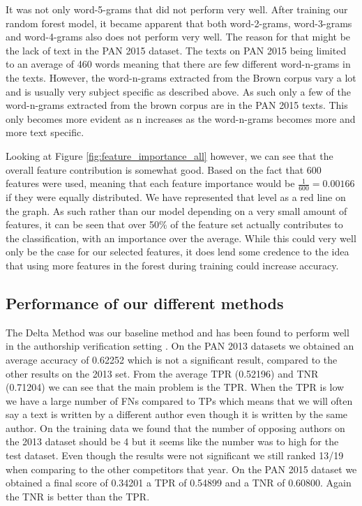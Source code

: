 It was not only word-5-grams that did not perform very well. After training our
random forest model, it became apparent that both word-2-grams, word-3-grams and
word-4-grams also does not perform very well. The reason for that might be the
lack of text in the PAN 2015 dataset. The texts on PAN 2015 being limited to an
average of 460 words meaning that there are few different word-n-grams in the
texts. However, the word-n-grams extracted from the Brown corpus vary a lot and
is usually very subject specific as described above. As such only a few of the
word-n-grams extracted from the brown corpus are in the PAN 2015 texts. This
only becomes more evident as n increases as the word-n-grams becomes more and
more text specific.

Looking at Figure \ref{fig:feature_importance_all} however, we can see that
the overall feature contribution is somewhat good. Based on the fact that 600
features were used, meaning that each feature importance would be $\frac{1}{600}
= 0.00166$ if they were equally distributed. We have represented that level as a
red line on the graph. As such rather than our model depending on a very small
amount of features, it can be seen that over 50\% of the feature set actually
contributes to the classification, with an importance over the average. While
this could very well only be the case for our selected features, it does lend
some credence to the idea that using more features in the forest during training
could increase accuracy.

\subsection{Performance of our different methods}

The Delta Method was our baseline method and has been found to perform well in
the authorship verification setting \cite{evert2015towards}. On the PAN 2013
datasets we obtained an average accuracy of 0.62252 which is not a significant
result, compared to the other results on the 2013 set. From the average
\gls{TPR} (0.52196) and \gls{TNR} (0.71204) we can see that the main problem is
the \gls{TPR}. When the \gls{TPR} is low we have a large number of \gls{FN}s
compared to \gls{TP}s which means that we will often say a text is written by a
different author even though it is written by the same author. On the training
data we found that the number of opposing authors on the 2013 dataset should be
4 but it seems like the number was to high for the test dataset. Even though the
results were not significant we still ranked 13/19 when comparing to the other
competitors that year. On the PAN 2015 dataset we obtained a final score of
0.34201 a \gls{TPR} of 0.54899 and a \gls{TNR} of 0.60800. Again the \gls{TNR}
is better than the \gls{TPR}.

